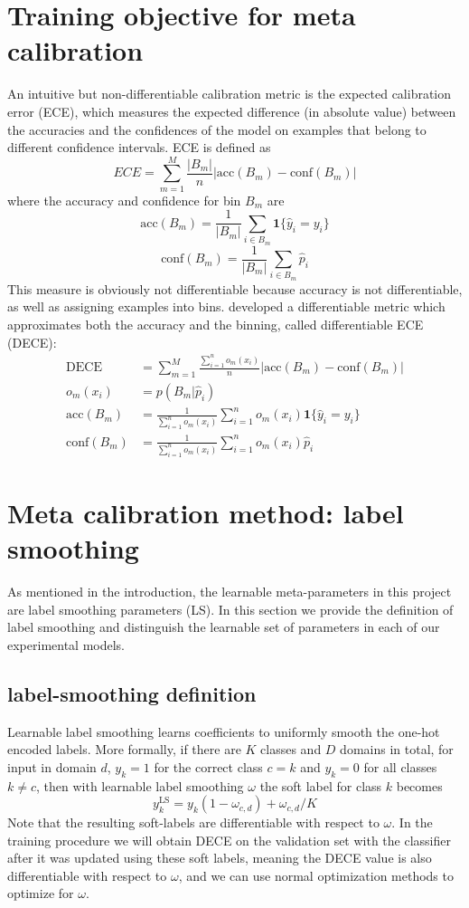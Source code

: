 \documentclass[12pt,a4paper]{article}
\begin{document}
\section{Training objective for meta calibration}
\label{sec:TrainingObjective}
An intuitive but non-differentiable calibration metric is the expected calibration error (ECE), which measures the expected difference (in absolute value) between the accuracies and the confidences of the model on examples that belong to different confidence intervals. ECE is defined as
\[
ECE = \sum_{m=1}^{M}{\frac{|B_m|}{n}\left|\text{acc}(B_m) - \text{conf}(B_m)\right|}
\]
where the accuracy and confidence for bin $B_m$ are
\[
\text{acc}(B_m) = \frac{1}{|B_m|}\sum_{i\in B_m}{\mathbf{1}\{\hat{y}_i = y_i\}}
\]
\[
\text{conf}(B_m) = \frac{1}{|B_m|}\sum_{i\in B_m}{\hat{p}_i}
\]
This measure is obviously not differentiable because accuracy is not differentiable, as well as assigning examples into bins. \cite{bohdal2021meta} developed a differentiable metric which approximates both the accuracy and the binning, called differentiable ECE (DECE):
\begin{equation*}
	\begin{split}
		\text{DECE} &= \sum_{m=1}^{M}{\frac{\sum_{i=1}^{n}{o_m(x_i)}}{n}\left|\text{acc}(B_m) - \text{conf}(B_m)\right|}\\
		o_m(x_i) &= p(B_m|\hat{p}_i)\\
		\text{acc}(B_m) &= \frac{1}{\sum_{i=1}^{n}{o_m(x_i)}}\sum_{i=1}^{n}{o_m(x_i) \mathbf{1}\{\hat{y}_i = y_i\}}\\
		\text{conf}(B_m) &= \frac{1}{\sum_{i=1}^{n}{o_m(x_i)}}\sum_{i=1}^{n}{o_m(x_i) \hat{p}_i}		
	\end{split}
\end{equation*}

\section{Meta calibration method: label smoothing}
\label{sec:LabelSmoothing}
As mentioned in the introduction, the learnable meta-parameters in this project are label smoothing parameters (LS). In this section we provide the definition of label smoothing and distinguish the learnable set of parameters in each of our experimental models.
	\subsection{label-smoothing definition}
	\label{ssec:LS-definition}
	Learnable label smoothing learns coefficients to uniformly smooth the one-hot encoded labels. More formally, if there are $K$ classes and $D$ domains in total, for input in domain $d$, $y_k=1$ for the correct class $c=k$ and $y_k=0$ for all classes $k \neq c$, then with learnable label smoothing $\omega$ the soft label for class $k$ becomes
	\[
	y_k^{\text{LS}}=y_k(1-\omega_{c,d}) + \omega_{c,d} / K
	\]
	Note that the resulting soft-labels are differentiable with respect to $\omega$. In the training procedure we will obtain DECE on the validation set with the classifier after it was updated using these soft labels, meaning the DECE value is also differentiable with respect to $\omega$, and we can use normal optimization methods to optimize for $\omega$.
\end{document}

